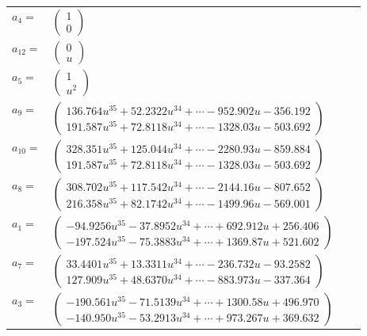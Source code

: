 \documentclass[1p]{elsarticle_modified}
\theoremstyle{definition}
\begin{document}
\begin{tabular}{m{7pt} m{180pt} m{7pt} m{180pt} }
\flushright $a_{4}=$&$\begin{pmatrix}1\\0\end{pmatrix}$ \\
\flushright $a_{12}=$&$\begin{pmatrix}0\\u\end{pmatrix}$ \\
\flushright $a_{5}=$&$\begin{pmatrix}1\\u^2\end{pmatrix}$ \\
\flushright $a_{9}=$&$\begin{pmatrix}136.764 u^{35}+52.2322 u^{34}+\cdots-952.902 u-356.192\\191.587 u^{35}+72.8118 u^{34}+\cdots-1328.03 u-503.692\end{pmatrix}$ \\
\flushright $a_{10}=$&$\begin{pmatrix}328.351 u^{35}+125.044 u^{34}+\cdots-2280.93 u-859.884\\191.587 u^{35}+72.8118 u^{34}+\cdots-1328.03 u-503.692\end{pmatrix}$ \\
\flushright $a_{8}=$&$\begin{pmatrix}308.702 u^{35}+117.542 u^{34}+\cdots-2144.16 u-807.652\\216.358 u^{35}+82.1742 u^{34}+\cdots-1499.96 u-569.001\end{pmatrix}$ \\
\flushright $a_{1}=$&$\begin{pmatrix}-94.9256 u^{35}-37.8952 u^{34}+\cdots+692.912 u+256.406\\-197.524 u^{35}-75.3883 u^{34}+\cdots+1369.87 u+521.602\end{pmatrix}$ \\
\flushright $a_{7}=$&$\begin{pmatrix}33.4401 u^{35}+13.3311 u^{34}+\cdots-236.732 u-93.2582\\127.909 u^{35}+48.6370 u^{34}+\cdots-883.973 u-337.364\end{pmatrix}$ \\
\flushright $a_{3}=$&$\begin{pmatrix}-190.561 u^{35}-71.5139 u^{34}+\cdots+1300.58 u+496.970\\-140.950 u^{35}-53.2913 u^{34}+\cdots+973.267 u+369.632\end{pmatrix}$ \\

\end{tabular}
\end{document}
